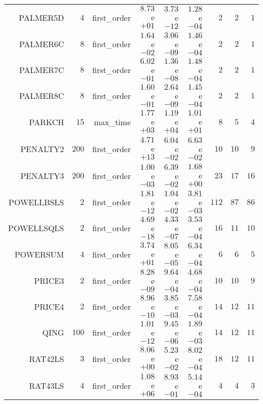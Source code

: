 \begin{longtable}{rrrrrrrrr}
PALMER5D & \(     4\) & first\_order & \( 8.73\)e\(+01\) & \( 3.73\)e\(-12\) & \( 1.28\)e\(-04\) & \(     2\) & \(     2\) & \(     1\) \\
PALMER6C & \(     8\) & first\_order & \( 1.64\)e\(-02\) & \( 3.06\)e\(-09\) & \( 1.46\)e\(-04\) & \(     2\) & \(     2\) & \(     1\) \\
PALMER7C & \(     8\) & first\_order & \( 6.02\)e\(-01\) & \( 1.36\)e\(-08\) & \( 1.48\)e\(-04\) & \(     2\) & \(     2\) & \(     1\) \\
PALMER8C & \(     8\) & first\_order & \( 1.60\)e\(-01\) & \( 2.64\)e\(-09\) & \( 1.45\)e\(-04\) & \(     2\) & \(     2\) & \(     1\) \\
PARKCH & \(    15\) & max\_time & \( 1.77\)e\(+03\) & \( 1.19\)e\(+04\) & \( 1.01\)e\(+01\) & \(     8\) & \(     5\) & \(     4\) \\
PENALTY2 & \(   200\) & first\_order & \( 4.71\)e\(+13\) & \( 6.04\)e\(-02\) & \( 6.63\)e\(-02\) & \(    10\) & \(    10\) & \(     9\) \\
PENALTY3 & \(   200\) & first\_order & \( 1.00\)e\(-03\) & \( 6.39\)e\(-02\) & \( 1.68\)e\(+00\) & \(    23\) & \(    17\) & \(    16\) \\
POWELLBSLS & \(     2\) & first\_order & \( 1.81\)e\(-12\) & \( 1.04\)e\(-02\) & \( 3.81\)e\(-03\) & \(   112\) & \(    87\) & \(    86\) \\
POWELLSQLS & \(     2\) & first\_order & \( 4.69\)e\(-18\) & \( 4.33\)e\(-07\) & \( 3.53\)e\(-04\) & \(    16\) & \(    11\) & \(    10\) \\
POWERSUM & \(     4\) & first\_order & \( 3.74\)e\(+01\) & \( 8.05\)e\(-05\) & \( 6.34\)e\(-04\) & \(     6\) & \(     6\) & \(     5\) \\
PRICE3 & \(     2\) & first\_order & \( 8.28\)e\(-09\) & \( 9.64\)e\(-04\) & \( 4.68\)e\(-04\) & \(    10\) & \(    10\) & \(     9\) \\
PRICE4 & \(     2\) & first\_order & \( 8.96\)e\(-10\) & \( 3.85\)e\(-03\) & \( 7.58\)e\(-04\) & \(    14\) & \(    12\) & \(    11\) \\
QING & \(   100\) & first\_order & \( 1.01\)e\(-12\) & \( 9.45\)e\(-06\) & \( 1.89\)e\(-03\) & \(    14\) & \(    12\) & \(    11\) \\
RAT42LS & \(     3\) & first\_order & \( 8.06\)e\(+00\) & \( 5.23\)e\(-02\) & \( 8.02\)e\(-04\) & \(    18\) & \(    12\) & \(    11\) \\
RAT43LS & \(     4\) & first\_order & \( 1.08\)e\(+06\) & \( 8.93\)e\(-01\) & \( 5.14\)e\(-04\) & \(     4\) & \(     4\) & \(     3\) \\

\end{longtable}
